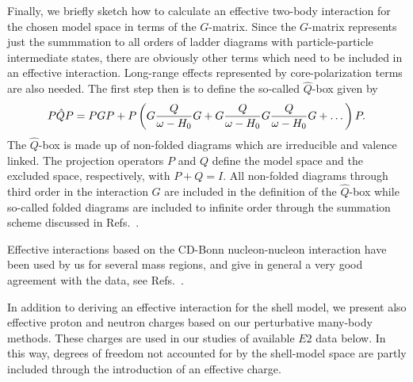\begin{multicols}{2}
Finally, we briefly sketch how to calculate an effective 
two-body interaction for the chosen model space
in terms of the $G$-matrix.  Since the $G$-matrix represents just
the summmation to all orders of ladder diagrams with particle-particle
intermediate states, there are obviously other terms which need to be included
in an effective interaction. Long-range effects represented by 
core-polarization terms are also needed.
The first step then is to define the so-called $\hat{Q}$-box given by
\begin{equation}
   P\hat{Q}P=PGP +
   P\left(G\frac{Q}{\omega-H_{0}}G\\ + G
   \frac{Q}{\omega-H_{0}}G \frac{Q}{\omega-H_{0}}G +\dots\right)P.
   \label{eq:qbox}
\end{equation}
The $\hat{Q}$-box is made up of non-folded diagrams which are irreducible
and valence linked. The projection operators $P$ and $Q$ define the model
space and the excluded space, respectively, with $P+Q=I$. 
All non-folded diagrams through 
third order in the interaction $G$ are included in the definition 
of the $\hat{Q}$-box while so-called 
folded diagrams are 
included to infinite order through the summation scheme discussed
in Refs.\ \cite{hko95,ko90}.

Effective interactions based on 
the CD-Bonn nucleon-nucleon interaction 
have been used by us for several mass regions, and give in general
a very good agreement with the data, see Refs.\ 
\cite{alex98,ehho98,ssh99,david99}.



In addition to deriving an effective interaction for the shell
model, we present also effective proton and neutron charges 
based on our perturbative many-body methods. These charges
are used in our studies of available $E2$ data below.
In this way, degrees
of freedom not accounted for by the shell-model space are partly
included through the introduction of an effective charge.


\end{multicols}
